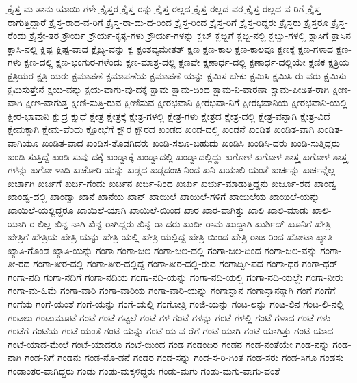 {ಕ್ರೈಸ್ತ-ಮ-ತಾನು-ಯಾಯಿ-ಗಳೇ
ಕ್ರೈಸ್ತರ
ಕ್ರೈಸ್ತ-ರನ್ನು
ಕ್ರೈಸ್ತ-ರಲ್ಲದ
ಕ್ರೈಸ್ತ-ರಲ್ಲದ-ವರ
ಕ್ರೈಸ್ತ-ರಲ್ಲದ-ವ-ರಿಗೆ
ಕ್ರೈಸ್ತ-ರಾಗುತ್ತಿದ್ದಾರೆ
ಕ್ರೈಸ್ತ-ರಾದ-ವ-ರಿಗೆ
ಕ್ರೈಸ್ತ-ರಾ-ದು-ದ-ರಿಂದ
ಕ್ರೈಸ್ತ-ರಿಂದ
ಕ್ರೈಸ್ತ-ರಿಗೆ
ಕ್ರೈಸ್ತ-ರಿದ್ದರು
ಕ್ರೈಸ್ತರು
ಕ್ರೈಸ್ತರೂ
ಕ್ರೈಸ್ತ-ರೆಂದು
ಕ್ರೈಸ್ತೇ-ತರ
ಕ್ರೌರ್ಯ
ಕ್ರೌರ್ಯ-ಕೃತ್ಯ-ಗಳು
ಕ್ರೌರ್ಯ-ಗಳನ್ನು
ಕ್ಲಬ್
ಕ್ಲಬ್ಬಿಗೆ
ಕ್ಲಬ್ಬಿ-ನಲ್ಲಿ
ಕ್ಲಬ್ಬು-ಗಳಲ್ಲಿ
ಕ್ಲಾಸಿಗೆ
ಕ್ಲಾಸಿನ
ಕ್ಲಾಸಿ-ನಲ್ಲಿ
ಕ್ಲಿಷ್ಟ
ಕ್ಲಿಷ್ಟ-ವಾದ
ಕ್ಲೈಬ್ಯ-ವನ್ನು
ಕ್ವ
ಕ್ಷಂತವ್ಯಮೇತತ್
ಕ್ಷಣ
ಕ್ಷಣ-ಕಾಲ
ಕ್ಷಣ-ಕಾಲವೂ
ಕ್ಷಣಕ್ಕೆ
ಕ್ಷಣ-ಗಳಾದ
ಕ್ಷಣ-ಗಳು
ಕ್ಷಣ-ದಲ್ಲಿ
ಕ್ಷಣ-ಭಂಗುರ-ಗಳೆಂದು
ಕ್ಷಣ-ಮಾತ್ರ-ದಲ್ಲಿ
ಕ್ಷಣವೇ
ಕ್ಷಣಾರ್ಧ-ದಲ್ಲಿ
ಕ್ಷಣಾರ್ಧ-ದಲ್ಲಿಯೇ
ಕ್ಷಣಿಕ
ಕ್ಷತ್ರಿಯ
ಕ್ಷತ್ರಿಯರ
ಕ್ಷತ್ರಿ-ಯರು
ಕ್ಷಮಾಪಣೆ
ಕ್ಷಮಾಪಣೆಯ
ಕ್ಷಮಾಪಣೆ-ಯನ್ನು
ಕ್ಷಮಿಸ-ಬೇಕು
ಕ್ಷಮಿಸಿ
ಕ್ಷಮಿಸಿ-ರು-ವರು
ಕ್ಷಮಿಸು
ಕ್ಷಮಿಸುತ್ತೇನೆ
ಕ್ಷಯ-ವನ್ನು
ಕ್ಷಯ-ವಾಗು-ವು-ದಕ್ಕೆ
ಕ್ಷಾಮ
ಕ್ಷಾಮ-ದಿಂದ
ಕ್ಷಾಮ-ನಿ-ವಾರಣಾ
ಕ್ಷಾಮ-ಪೀಡಿತ-ರಾಗಿ
ಕ್ಷೀಣ-ವಾಗಿ
ಕ್ಷೀಣ-ವಾಗುತ್ತ
ಕ್ಷೀಣಿ-ಸುತ್ತಿ-ರುವ
ಕ್ಷೀಣಿಸುವ
ಕ್ಷೀರಭವಾನಿ
ಕ್ಷೀರಭವಾ-ನಿಗೆ
ಕ್ಷೀರಭವಾನಿಯ
ಕ್ಷೀರಭವಾನಿ-ಯಲ್ಲಿ
ಕ್ಷೀರ-ಭಾವಾನಿ
ಕ್ಷುದ್ರ
ಕ್ಷುಧೆ
ಕ್ಷೇತ್ರ
ಕ್ಷೇತ್ರಕ್ಕೆ
ಕ್ಷೇತ್ರ-ಗಳಲ್ಲಿ
ಕ್ಷೇತ್ರ-ಗಳು
ಕ್ಷೇತ್ರದ
ಕ್ಷೇತ್ರ-ದಲ್ಲಿ
ಕ್ಷೇತ್ರ-ವನ್ನಾಗಿ
ಕ್ಷೇತ್ರ-ವಿದೆ
ಕ್ಷೇಮಕ್ಕಾಗಿ
ಕ್ಷೇಮ-ವೆಂದು
ಕ್ಷೋಭೆಗೆ
ಕ್ಷೌರ
ಕ್ಷೌರದ
ಖಂಡದ
ಖಂಡ-ದಲ್ಲಿ
ಖಂಡನೆ
ಖಂಡಿತ
ಖಂಡಿತ-ವಾಗಿ
ಖಂಡಿತ-ವಾಗಿಯೂ
ಖಂಡಿತ-ವಾದ
ಖಂಡಿಸ-ತೊಡಗಿದರು
ಖಂಡಿ-ಸಲೂ-ಬಹುದು
ಖಂಡಿಸಿ
ಖಂಡಿಸಿ-ದರು
ಖಂಡಿ-ಸುತ್ತಿದ್ದರು
ಖಂಡಿ-ಸುತ್ತಿದ್ದೆ
ಖಂಡಿ-ಸುವು-ದಕ್ಕೆ
ಖಂಡ್ವಾಕ್ಕೆ
ಖಂಡ್ವಾದಲ್ಲಿ
ಖಂಡ್ವಾದಲ್ಲಿದ್ದು
ಖಗೋಳ
ಖಗೋಳ-ಶಾಸ್ತ್ರ
ಖಗೋಳ-ಶಾಸ್ತ್ರ-ಗಳನ್ನು
ಖಗೋ-ಳಾದಿ
ಖಚೋರಿ-ಯನ್ನು
ಖಡ್ಗದ
ಖಡ್ಗದಂಚಿ-ನಿಂದ
ಖನಿ
ಖಯಾಲಿ-ಯಂತೆ
ಖರ್ಚನ್ನು
ಖರ್ಚನ್ನೆಲ್ಲ
ಖರ್ಚಾಗಿ
ಖರ್ಚಿಗೆ
ಖರ್ಚಿ-ಗೆಂದು
ಖರ್ಚಿನ
ಖರ್ಚಿ-ನಿಂದ
ಖರ್ಚು
ಖರ್ಚು-ಮಾಡುತ್ತಿದ್ದನು
ಖರ್ಜೂ-ರದ
ಖಾಂಡ್ವ
ಖಾಂಡ್ವ-ದಲ್ಲಿ
ಖಾಂಡ್ವಾ
ಖಾನೆ
ಖಾನೆಯ
ಖಾನ್
ಖಾಯಿಲೆ
ಖಾಯಿಲೆ-ಗಳಿಗೆ
ಖಾಯಿಲೆಯ
ಖಾಯಿಲೆ-ಯನ್ನು
ಖಾಯಿಲೆ-ಯಲ್ಲಿದ್ದರೂ
ಖಾಯಿಲೆ-ಯಾಗಿ
ಖಾಯಿಲೆ-ಯಿಂದ
ಖಾರ
ಖಾರ-ವಾಗಿತ್ತು
ಖಾಲಿ
ಖಾಲಿ-ಮಾಡು
ಖಾಲಿ-ಯಾಗಿ-ರ-ಲಿಲ್ಲ
ಖಿನ್ನ-ನಾಗಿ
ಖಿನ್ನ-ರಾಗಿದ್ದರು
ಖಿನ್ನ-ರಾ-ದರು
ಖುದೀ-ರಾಮ
ಖುದ್ದಾಗಿ
ಖುರ್ಶಿದ್
ಖೂನಿಗೆ
ಖೇತ್ರಿ
ಖೇತ್ರಿಗೆ
ಖೇತ್ರಿಯ
ಖೇತ್ರಿ-ಯನ್ನು
ಖೇತ್ರಿ-ಯಲ್ಲಿ
ಖೇತ್ರಿ-ಯಲ್ಲಿದ್ದ
ಖೇತ್ರಿ-ಯಿಂದ
ಖೇತ್ರಿ-ರಾಜ-ರಿಂದ
ಖೋಟಾ
ಖ್ಯಾತಿ
ಖ್ಯಾತಿ-ಗೊಂಡ
ಖ್ಯಾತಿ-ಯನ್ನು
ಗಂಗಾ
ಗಂಗಾ-ಜಲ
ಗಂಗಾ-ಜಲ-ದಲ್ಲಿ
ಗಂಗಾ-ಜಲ-ದಿಂದ
ಗಂಗಾ-ಜಲ-ವನ್ನು
ಗಂಗಾ-ತೀ-ರದ
ಗಂಗಾ-ತೀರ-ದಲ್ಲಿ
ಗಂಗಾ-ತೀರ-ದಲ್ಲಿದ್ದ
ಗಂಗಾ-ತೀರ-ದಲ್ಲಿ-ರುವ
ಗಂಗಾದ್ವೀ-ಪದ
ಗಂಗಾ-ಧರ
ಗಂಗಾ-ಧರ್
ಗಂಗಾ-ನದಿ
ಗಂಗಾ-ನದಿಗೆ
ಗಂಗಾ-ನದಿಯ
ಗಂಗಾ-ನದಿ-ಯನ್ನು
ಗಂಗಾ-ನದಿ-ಯಲ್ಲಿ
ಗಂಗಾ-ನದಿ-ಯಲ್ಲೇ
ಗಂಗಾ-ನೀರು
ಗಂಗಾ-ಮ-ಹಿಮೆ
ಗಂಗಾ-ವಾರಿ
ಗಂಗಾ-ವಾರಿಯ
ಗಂಗಾ-ವಾರಿ-ಯನ್ನು
ಗಂಗಾಸ್ನಾನ
ಗಂಗಾಸ್ನಾನಕ್ಕಾಗಿ
ಗಂಗೆ
ಗಂಗೆಗೆ
ಗಂಗೆಯ
ಗಂಗೆ-ಯಂತೆ
ಗಂಗೆ-ಯನ್ನು
ಗಂಗೆ-ಯಲ್ಲಿ
ಗಂಗೋತ್ರಿ
ಗಂಜಿ-ಯನ್ನು
ಗಂಟ-ಲನ್ನು
ಗಂಟ-ಲಿನ
ಗಂಟ-ಲಿ-ನಲ್ಲಿ
ಗಂಟಲು
ಗಂಟುಮೂಟೆ
ಗಂಟೆ
ಗಂಟೆ-ಗಟ್ಟಲೆ
ಗಂಟೆ-ಗಳ
ಗಂಟೆ-ಗಳನ್ನು
ಗಂಟೆ-ಗಳಲ್ಲಿ
ಗಂಟೆ-ಗಳಾದ
ಗಂಟೆ-ಗಳು
ಗಂಟೆಗೆ
ಗಂಟೆಯ
ಗಂಟೆ-ಯಂತೆ
ಗಂಟೆ-ಯನ್ನು
ಗಂಟೆ-ಯ-ವ-ರೆಗೆ
ಗಂಟೆ-ಯಾಗಿ
ಗಂಟೆ-ಯಾಗಿತ್ತು
ಗಂಟೆ-ಯಾದ
ಗಂಟೆ-ಯಾದ-ಮೇಲೆ
ಗಂಟೆ-ಯಾದರೂ
ಗಂಟೆ-ಯಿಂದ
ಗಂಡ
ಗಂಡಂದಿರ
ಗಂಡನ
ಗಂಡ-ನಂತೆಯೇ
ಗಂಡ-ನನ್ನು
ಗಂಡ-ನಾಗಿ
ಗಂಡ-ನಿಗೆ
ಗಂಡನು
ಗಂಡ-ನೊ-ಡನೆ
ಗಂಡರ
ಗಂಡ-ಸನ್ನು
ಗಂಡ-ಸ-ರಿ-ಗಿಂತ
ಗಂಡ-ಸರು
ಗಂಡ-ಸಿಗೂ
ಗಂಡಸು
ಗಂಡಾಂತರ-ವಾಗಿದ್ದರು
ಗಂಡು
ಗಂಡು-ಮಕ್ಕಳಿದ್ದರು
ಗಂಡು-ಮಗು
ಗಂಡು-ಮಗು-ವಾಗು-ವಂತೆ
}
